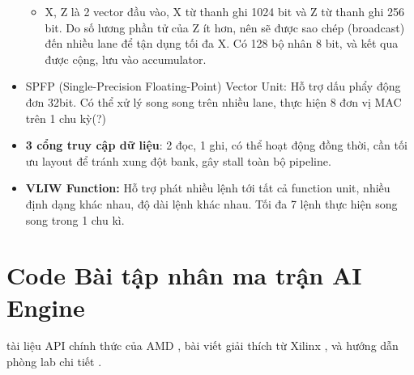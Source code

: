 \begin{itemize}
\begin{itemize}
\begin{figure}[H]
        \label{fig:enter-label}
    \end{figure}
        \item X, Z là 2 vector đầu vào, X từ thanh ghi 1024 bit và Z từ thanh ghi 256 bit. Do số lương phần tử của Z ít hơn, nên sẽ được sao chép (broadcast) đến nhiều lane để tận dụng tối đa X. Có 128 bộ nhân 8 bit, và kết qua được cộng, lưu vào accumulator.
    \end{itemize}
    \item SPFP (Single-Precision Floating-Point) Vector Unit: Hỗ trợ dấu phẩy động đơn 32bit. Có thể xử lý song song trên nhiều lane, thực hiện 8 đơn vị MAC trên 1 chu kỳ(?)
    \item  \textbf{3 cổng truy cập dữ liệu}: 2 đọc, 1 ghi, có thể hoạt động đồng thời, cần tối ưu layout để tránh xung đột bank, gây stall toàn bộ pipeline.
    \item \textbf{VLIW Function:} Hỗ trợ phát nhiều lệnh tới tất cả function unit, nhiều định dạng khác nhau, độ dài lệnh khác nhau. Tối đa 7 lệnh thực hiện song song trong 1 chu kì.
    
\end{itemize}


    





\newpage
\section{Code Bài tập nhân ma trận AI Engine}

 tài liệu API chính thức của AMD \cite{UG1079}, \cite{MMUL_API}
bài viết giải thích từ Xilinx \cite{XUP_Explained}, và hướng dẫn phòng lab chi tiết \cite{XUP_Lab}.

